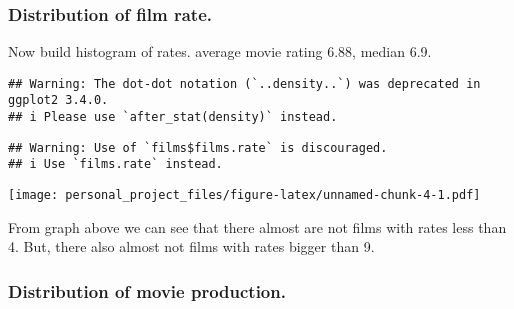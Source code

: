 \documentclass[
]{article}
\newenvironment{Shaded}{\begin{snugshade}}{\end{snugshade}}
\newcommand{\AttributeTok}[1]{\textcolor[rgb]{0.77,0.63,0.00}{#1}}
\newcommand{\DecValTok}[1]{\textcolor[rgb]{0.00,0.00,0.81}{#1}}
\newcommand{\FunctionTok}[1]{\textcolor[rgb]{0.00,0.00,0.00}{#1}}
\newcommand{\NormalTok}[1]{#1}
\newcommand{\SpecialCharTok}[1]{\textcolor[rgb]{0.00,0.00,0.00}{#1}}
\newcommand{\StringTok}[1]{\textcolor[rgb]{0.31,0.60,0.02}{#1}}
\begin{document}
\hypertarget{distribution-of-film-rate.}{%
\subsubsection{Distribution of film
rate.}\label{distribution-of-film-rate.}}

Now build histogram of rates. average movie rating 6.88, median 6.9.

\begin{Shaded}
\end{Shaded}

\begin{verbatim}
## Warning: The dot-dot notation (`..density..`) was deprecated in ggplot2 3.4.0.
## i Please use `after_stat(density)` instead.
\end{verbatim}

\begin{verbatim}
## Warning: Use of `films$films.rate` is discouraged.
## i Use `films.rate` instead.
\end{verbatim}

\texttt{[image: personal\_project\_files/figure-latex/unnamed-chunk-4-1.pdf]}

From graph above we can see that there almost are not films with rates
less than 4. But, there also almost not films with rates bigger than 9.

\hypertarget{distribution-of-movie-production.}{%
\subsubsection{Distribution of movie
production.}\label{distribution-of-movie-production.}}
\end{document}
